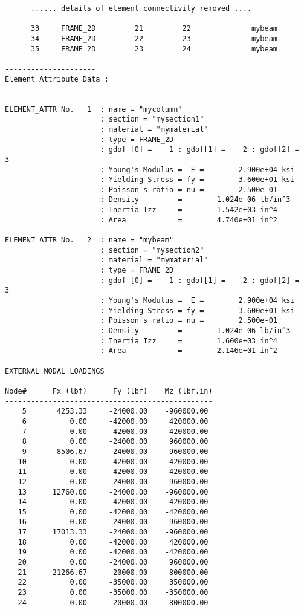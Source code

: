 \begin{footnotesize}
\begin{verbatim}
      ...... details of element connectivity removed ....

      33     FRAME_2D         21         22              mybeam
      34     FRAME_2D         22         23              mybeam
      35     FRAME_2D         23         24              mybeam

--------------------- 
Element Attribute Data :        
--------------------- 

ELEMENT_ATTR No.   1  : name = "mycolumn" 
                      : section = "mysection1" 
                      : material = "mymaterial" 
                      : type = FRAME_2D
                      : gdof [0] =    1 : gdof[1] =    2 : gdof[2] =    3
                      : Young's Modulus =  E =        2.900e+04 ksi
                      : Yielding Stress = fy =        3.600e+01 ksi
                      : Poisson's ratio = nu =        2.500e-01   
                      : Density         =        1.024e-06 lb/in^3
                      : Inertia Izz     =        1.542e+03 in^4
                      : Area            =        4.740e+01 in^2

ELEMENT_ATTR No.   2  : name = "mybeam" 
                      : section = "mysection2" 
                      : material = "mymaterial" 
                      : type = FRAME_2D
                      : gdof [0] =    1 : gdof[1] =    2 : gdof[2] =    3
                      : Young's Modulus =  E =        2.900e+04 ksi
                      : Yielding Stress = fy =        3.600e+01 ksi
                      : Poisson's ratio = nu =        2.500e-01   
                      : Density         =        1.024e-06 lb/in^3
                      : Inertia Izz     =        1.600e+03 in^4
                      : Area            =        2.146e+01 in^2
                        
EXTERNAL NODAL LOADINGS 
------------------------------------------------
Node#      Fx (lbf)      Fy (lbf)    Mz (lbf.in)
------------------------------------------------
    5       4253.33     -24000.00    -960000.00
    6          0.00     -42000.00     420000.00
    7          0.00     -42000.00    -420000.00
    8          0.00     -24000.00     960000.00
    9       8506.67     -24000.00    -960000.00
   10          0.00     -42000.00     420000.00
   11          0.00     -42000.00    -420000.00
   12          0.00     -24000.00     960000.00
   13      12760.00     -24000.00    -960000.00
   14          0.00     -42000.00     420000.00
   15          0.00     -42000.00    -420000.00
   16          0.00     -24000.00     960000.00
   17      17013.33     -24000.00    -960000.00
   18          0.00     -42000.00     420000.00
   19          0.00     -42000.00    -420000.00
   20          0.00     -24000.00     960000.00
   21      21266.67     -20000.00    -800000.00
   22          0.00     -35000.00     350000.00
   23          0.00     -35000.00    -350000.00
   24          0.00     -20000.00     800000.00


\end{verbatim}
\end{footnotesize}
